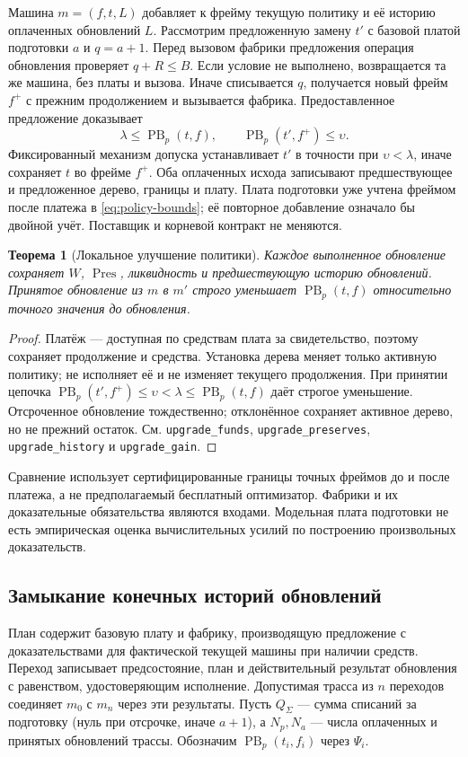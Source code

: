 \documentclass[10pt,a4paper]{article}
\newtheorem{theorem}{Теорема}[section]
\newcommand{\PB}{\operatorname{PB}}
\newcommand{\Pres}{\operatorname{Pres}}
\newcommand{\rc}[1]{\allowbreak\texttt{#1}\allowbreak}
\begin{document}
Машина $m=(f,t,L)$ добавляет к фрейму текущую политику и её историю оплаченных обновлений $L$. Рассмотрим предложенную замену $t'$ с базовой платой подготовки $a$ и $q=a+1$. Перед вызовом фабрики предложения операция обновления проверяет $q+R\le B$. Если условие не выполнено, возвращается та же машина, без платы и вызова. Иначе списывается $q$, получается новый фрейм $f^+$ с прежним продолжением и вызывается фабрика. Предоставленное предложение доказывает
\begin{equation}\label{eq:policy-bounds}
 \lambda\le\PB_p(t,f),\qquad \PB_p(t',f^+)\le\upsilon.
\end{equation}
Фиксированный механизм допуска устанавливает $t'$ в точности при $\upsilon<\lambda$, иначе сохраняет $t$ во фрейме $f^+$. Оба оплаченных исхода записывают предшествующее и предложенное дерево, границы и плату. Плата подготовки уже учтена фреймом после платежа в \eqref{eq:policy-bounds}; её повторное добавление означало бы двойной учёт. Поставщик и корневой контракт не меняются.

\begin{theorem}[Локальное улучшение политики]\label{thm:policy-local}
Каждое выполненное обновление сохраняет $W$, $\Pres$, ликвидность и предшествующую историю обновлений. Принятое обновление из $m$ в $m'$ строго уменьшает $\PB_p(t,f)$ относительно точного значения до обновления.
\end{theorem}
\begin{proof}
Платёж --- доступная по средствам плата за свидетельство, поэтому сохраняет продолжение и средства. Установка дерева меняет только активную политику; не исполняет её и не изменяет текущего продолжения. При принятии цепочка $\PB_p(t',f^+)\le\upsilon<\lambda\le\PB_p(t,f)$ даёт строгое уменьшение. Отсроченное обновление тождественно; отклонённое сохраняет активное дерево, но не прежний остаток. См. \rc{upgrade\_funds}, \rc{upgrade\_preserves}, \rc{upgrade\_history} и \rc{upgrade\_gain}.
\end{proof}
Сравнение использует сертифицированные границы точных фреймов до и после платежа, а не предполагаемый бесплатный оптимизатор. Фабрики и их доказательные обязательства являются входами. Модельная плата подготовки не есть эмпирическая оценка вычислительных усилий по построению произвольных доказательств.

\subsection{Замыкание конечных историй обновлений}
План содержит базовую плату и фабрику, производящую предложение с доказательствами для фактической текущей машины при наличии средств. Переход записывает предсостояние, план и действительный результат обновления с равенством, удостоверяющим исполнение. Допустимая трасса из $n$ переходов соединяет $m_0$ с $m_n$ через эти результаты. Пусть $Q_\Sigma$ --- сумма списаний за подготовку (нуль при отсрочке, иначе $a+1$), а $N_p,N_a$ --- числа оплаченных и принятых обновлений трассы. Обозначим $\PB_p(t_i,f_i)$ через $\Psi_i$.
\end{document}
